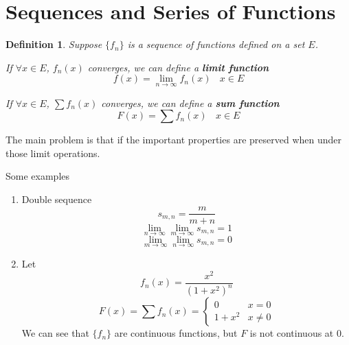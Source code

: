 \documentclass[aps,pra,onecolumn,notitlepage,superscriptaddress]{revtex4-1}
\newtheorem{defi}{Definition}
\begin{document}
    \section{Sequences and Series of Functions}
    \begin{defi}
        Suppose $\{f_n\}$ is a sequence of functions defined on a set $E$. 
        
        If $\forall x \in E$, $f_n(x)$ converges, we can define a \textbf{limit function}
        \begin{equation}
            f(x) = \lim_{n \to \infty} f_n(x) \ \ \ \ x \in E
        \end{equation}

        If $\forall x \in E$, $\sum f_n(x)$ converges, we can define a \textbf{sum function}
        \begin{equation}
            F(x) = \sum f_n(x) \ \ \ \ x \in E
        \end{equation}
    \end{defi}

    The main problem is that if the important properties are preserved when under those limit operations.

    Some examples
    \begin{enumerate}
        \item Double sequence
        \begin{equation}
            s_{m,n} = \frac{m}{m+n}
        \end{equation}
        \begin{equation}
            \lim_{n \to \infty}\lim_{m \to \infty} s_{m,n} = 1
        \end{equation}
        \begin{equation}
            \lim_{m \to \infty}\lim_{n \to \infty} s_{m,n} = 0
        \end{equation}

        \item Let
        \begin{equation}
            f_n(x) = \frac{x^2}{(1+x^2)^n}
        \end{equation}
        \begin{equation}
            F(x) = \sum f_n(x) = \begin{cases}
                0 & x = 0 \\
                1+x^2 & x \neq 0
            \end{cases}
        \end{equation}
        We can see that $\{f_n\}$ are continuous functions, but $F$ is not continuous at $0$.
    \end{enumerate}
\end{document}
